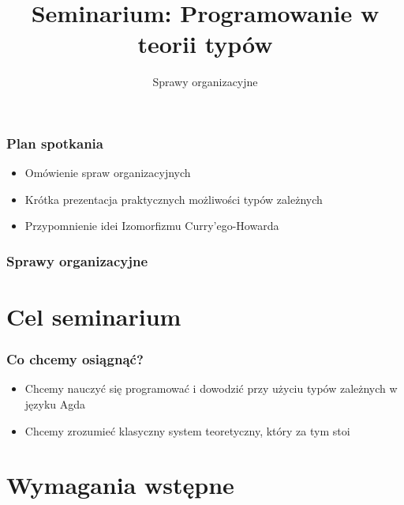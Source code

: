 \documentclass{beamer}
\title{Seminarium: Programowanie w teorii typów}
\subtitle{Sprawy organizacyjne}
\begin{document}

\maketitle


\begin{frame}
\frametitle{Plan spotkania}

\begin{itemize}

\item Omówienie spraw organizacyjnych
\item Krótka prezentacja praktycznych możliwości typów zależnych 
\item Przypomnienie idei Izomorfizmu Curry'ego-Howarda

\end{itemize}

\end{frame}


\begin{frame}
\frametitle{Sprawy organizacyjne}

\tableofcontents[hidesubsections]

\end{frame}


\section{Cel seminarium}

\begin{frame}

\frametitle{Co chcemy osiągnąć?}

\begin{itemize}
\item Chcemy nauczyć się programować i dowodzić przy użyciu typów zależnych w języku Agda
\item Chcemy zrozumieć klasyczny system teoretyczny, który za tym stoi
\end{itemize}

\end{frame}


\section{Wymagania wstępne}
\end{document}
